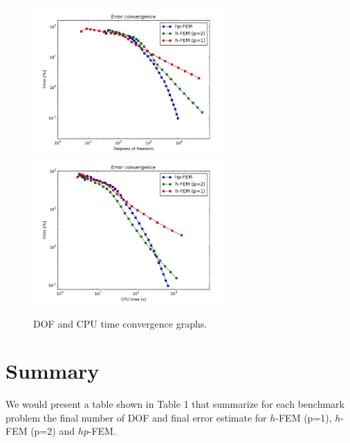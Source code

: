 \documentclass[12pt]{elsarticle}
\begin{document}
\begin{figure}[H]
\centering
\hspace{-50mm}
\includegraphics[width=7.5cm]{mafig75.pdf}\ \
\hspace{-10mm}
\includegraphics[width=7.5cm]{mafig76.pdf}
\hspace{-50mm}
\vspace{-2mm}
\caption{DOF and CPU time convergence graphs.}
\label{fig:nist-12-conv}
\end{figure}


\section{Summary}
\label{sec:Summary}

We would present a table shown in Table 1 that summarize
for each benchmark problem the final number of DOF and final error estimate
for $h$-FEM (p=1), $h$-FEM (p=2) and $hp$-FEM.
\end{document}
